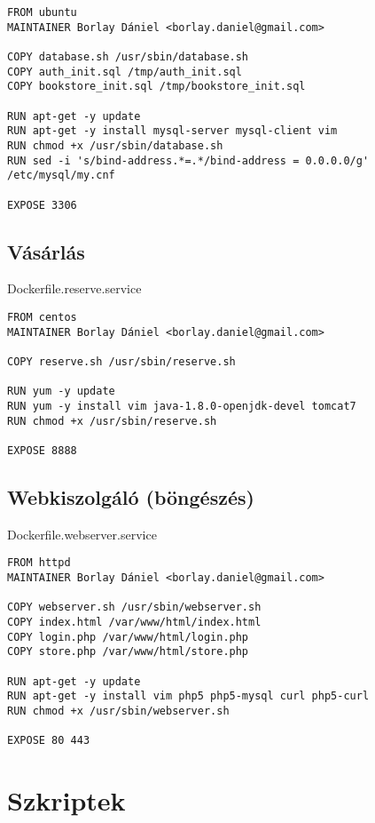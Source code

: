 \begin{verbatim}
FROM ubuntu
MAINTAINER Borlay Dániel <borlay.daniel@gmail.com>

COPY database.sh /usr/sbin/database.sh
COPY auth_init.sql /tmp/auth_init.sql
COPY bookstore_init.sql /tmp/bookstore_init.sql

RUN apt-get -y update
RUN apt-get -y install mysql-server mysql-client vim
RUN chmod +x /usr/sbin/database.sh
RUN sed -i 's/bind-address.*=.*/bind-address = 0.0.0.0/g' /etc/mysql/my.cnf

EXPOSE 3306
\end{verbatim}

\subsection{Vásárlás}\label{vuxe1suxe1rluxe1s}

Dockerfile.reserve.service

\begin{verbatim}
FROM centos
MAINTAINER Borlay Dániel <borlay.daniel@gmail.com>

COPY reserve.sh /usr/sbin/reserve.sh

RUN yum -y update
RUN yum -y install vim java-1.8.0-openjdk-devel tomcat7
RUN chmod +x /usr/sbin/reserve.sh

EXPOSE 8888
\end{verbatim}

\subsection{Webkiszolgáló
(böngészés)}\label{webkiszolguxe1luxf3-buxf6nguxe9szuxe9s}

Dockerfile.webserver.service

\begin{verbatim}
FROM httpd
MAINTAINER Borlay Dániel <borlay.daniel@gmail.com>

COPY webserver.sh /usr/sbin/webserver.sh
COPY index.html /var/www/html/index.html
COPY login.php /var/www/html/login.php
COPY store.php /var/www/html/store.php

RUN apt-get -y update
RUN apt-get -y install vim php5 php5-mysql curl php5-curl
RUN chmod +x /usr/sbin/webserver.sh

EXPOSE 80 443
\end{verbatim}

\section{Szkriptek}\label{szkriptek}

